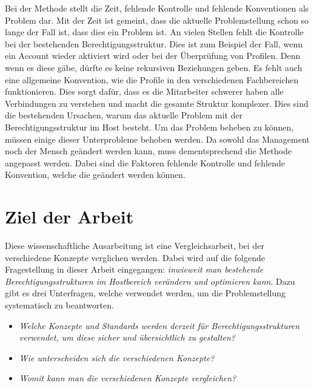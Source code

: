 \newline
Bei der Methode stellt die Zeit, fehlende Kontrolle und fehlende Konventionen als Problem dar.
Mit der Zeit ist gemeint, dass die aktuelle Problemstellung schon so lange der Fall ist, dass dies ein Problem ist.
An vielen Stellen fehlt die Kontrolle bei der bestehenden Berechtigungsstruktur.
Dies ist zum Beispiel der Fall, wenn ein Account wieder aktiviert wird oder bei der Überprüfung von Profilen.
Denn wenn es diese gäbe, dürfte es keine rekursiven Beziehungen geben.
Es fehlt auch eine allgemeine Konvention, wie die Profile in den verschiedenen Fachbereichen funktionieren.
Dies sorgt dafür, dass es die Mitarbeiter schwerer haben alle Verbindungen zu verstehen und macht die gesamte Struktur komplexer.
\newline
Dies sind die bestehenden Ursachen, warum das aktuelle Problem mit der Berechtigungsstruktur im Host besteht.
Um das Problem beheben zu können, müssen einige dieser Unterprobleme behoben werden.
Da sowohl das Management noch der Mensch geändert werden kann, muss dementsprechend die Methode angepasst werden.
Dabei sind die Faktoren fehlende Kontrolle und fehlende Konvention, welche die geändert werden können.
\newpage

\section{Ziel der Arbeit}
\label{sec:intro:goal}
Diese wissenschaftliche Ausarbeitung ist eine Vergleichsarbeit, bei der verschiedene Konzepte verglichen werden.
Dabei wird auf die folgende Fragestellung in dieser Arbeit eingegangen: \textit{inwieweit man bestehende Berechtigungsstrukturen im Hostbereich verändern und optimieren kann}.
Dazu gibt es drei Unterfragen, welche verwendet werden, um die Problemstellung systematisch zu beantworten.

\begin{itemize}
  \item \textit{Welche Konzepte und Standards werden derzeit für Berechtigungsstrukturen verwendet, um diese sicher und übersichtlich zu gestalten?}
  \item \textit{Wie unterscheiden sich die verschiedenen Konzepte?}
  \item \textit{Womit kann man die verschiedenen Konzepte vergleichen?}
\end{itemize}

